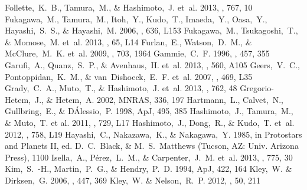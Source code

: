\documentclass[apj]{emulateapj-rtx4}
\begin{document}
\begin{thebibliography}{}
   Follette,~K.~B., Tamura,~M., \& Hashimoto,~J. et~al. 2013, \apj, 767, 10 
   Fukagawa,~M., Tamura,~M., Itoh,~Y., Kudo,~T., Imaeda,~Y., Oasa,~Y., Hayashi,~S.~S., \& Hayashi,~M. 2006, \apj, 636, L153
   Fukagawa,~M., Tsukagoshi,~T., \& Momose,~M. et~al. 2013, \pasj, 65, L14 
   Furlan,~E., Watson,~D.~M., \& McClure,~M.~K. et~al. 2009, \apj, 703, 1964 
   Gammie,~C.~F. 1996, \apj, 457, 355 
   Garufi,~A., Quanz,~S.~P., \& Avenhaus,~H. et~al. 2013, \aap, 560, A105 
   Geers,~V.~C., Pontoppidan,~K.~M., \& van~Dishoeck,~E.~F. et~al. 2007, \aap, 469, L35 
   Grady,~C.~A., Muto,~T., \& Hashimoto,~J. et~al. 2013, \apj, 762, 48 
   Gregorio-Hetem,~J., \& Hetem,~A. 2002, MNRAS, 336, 197
   Hartmann,~L., Calvet,~N., Gullbring,~E., \& D\'Alessio,~P. 1998, ApJ, 495, 385 
   Hashimoto,~J., Tamura,~M., \& Muto,~T. et al. 2011, \apjl, 729, L17 
   Hashimoto,~J., Dong,~R., \& Kudo,~T. et~al. 2012, \apjl, 758, L19 
   Hayashi,~C., Nakazawa,~K., \& Nakagawa,~Y. 1985, in Protostars and Planets II, ed. D.~C.~Black, \& M.~S.~Matthews (Tucson, AZ: Univ. Arizona Press), 1100
   Isella,~A., P\'{e}rez,~L.~M., \& Carpenter,~J.~M. et~al. 2013, \apj, 775, 30 
   Kim,~S.~-H., Martin,~P.~G., \& Hendry,~P.~D. 1994, ApJ, 422, 164 
   Kley,~W. \& Dirksen,~G. 2006, \aap, 447, 369 
   Kley,~W. \& Nelson,~R.~P. 2012, \araa, 50, 211 

\end{thebibliography}
\end{document}

